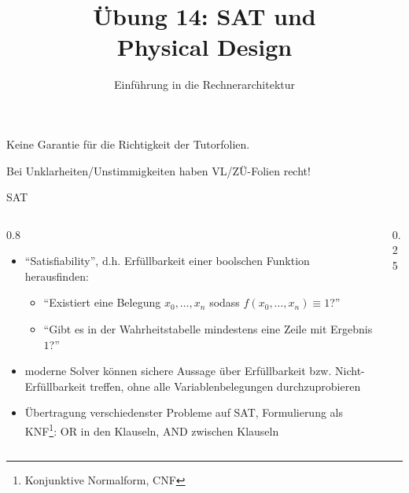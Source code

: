 

\renewcommand{\n}[1]{\overline{#1}}

\title{Übung 14: SAT und \\Physical Design}
\subtitle{Einführung in die Rechnerarchitektur}
\date{}




\maketitle

\begin{frame}[c, fragile]{}{}
	\begin{center}
		\LARGE  Keine Garantie für die Richtigkeit der Tutorfolien.

		\Large Bei Unklarheiten/Unstimmigkeiten haben VL/ZÜ-Folien recht!
	\end{center}
\end{frame}

\begin{frame}[c]{SAT}{}
	\begin{columns}[c]
		\begin{column}{0.8\textwidth}
			\begin{itemize}
				\item \enquote{Satisfiability}, d.h. Erfüllbarkeit einer boolschen Funktion herausfinden:
				      \begin{itemize}
					      \item  \enquote{Existiert eine Belegung $x_0, \ldots, x_n$ sodass $f(x_0, \ldots, x_n)\equiv 1$?}
					      \item \enquote{Gibt es in der Wahrheitstabelle mindestens eine Zeile  mit Ergebnis $1$?}
				      \end{itemize}
				\item moderne Solver können sichere Aussage über Erfüllbarkeit bzw. Nicht-Erfüllbarkeit treffen, ohne alle Variablenbelegungen durchzuprobieren
				\item Übertragung verschiedenster Probleme auf SAT, Formulierung als KNF\footnote[frame]{Konjunktive Normalform, CNF}: OR in den Klauseln, AND zwischen Klauseln
			\end{itemize}
		\end{column}%
		\begin{column}{0.25\textwidth}
		\end{column}
	\end{columns}
\end{frame}

